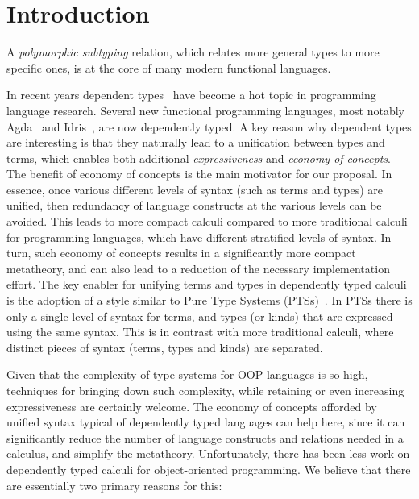 \section{Introduction}

A \emph{polymorphic subtyping} relation, which relates more general
types to more specific ones, is at the core of many modern functional
languages.


In recent years dependent
types~\cite{coc,cayenne,dep:pisigma,sjoberg:msfp12,guru,fc:kind,zombie:popl14,zombie:popl15} 
have become a hot topic in programming
language research. Several new
functional programming languages, most notably Agda~\cite{2007_norell_agda} and
Idris~\cite{brady2013idris}, are now dependently typed. 
A key reason why dependent types are interesting is
that they naturally lead to a unification between types and terms, which enables both
additional \emph{expressiveness} and \emph{economy of concepts}. 
The benefit of economy of concepts is the main
motivator for our proposal. In essence, once various different levels of syntax (such 
as terms and types) are unified, then redundancy of language
constructs at the various levels can be avoided. This leads to more
compact calculi compared to more traditional calculi for
programming languages, which have different stratified levels 
of syntax. In turn, such economy of concepts results in a significantly
more compact metatheory, and can also lead to a reduction of 
the necessary implementation effort.
The key enabler for unifying terms and types in dependently typed
calculi is the adoption of a style similar to 
Pure Type Systems (PTSs)~\cite{pts}. In PTSs there is only a single level 
of syntax for terms, and types (or kinds) that are expressed using the 
same syntax. This is in contrast with more traditional calculi, where 
distinct pieces of syntax (terms, types and kinds) are separated.

Given that the complexity of type systems
for OOP languages is so high, techniques for bringing down such
complexity, while retaining or even increasing expressiveness are certainly
welcome. The economy of concepts afforded by unified syntax typical of 
dependently typed languages can help here, since it can significantly
reduce the number of language constructs and relations needed in a
calculus, and simplify the metatheory.
Unfortunately, there has been less work on dependently typed
calculi for object-oriented programming. We believe that there are
essentially two primary reasons for this:

